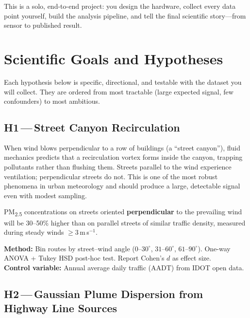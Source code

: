 \documentclass[11pt, letterpaper]{article}
\begin{document}
This is a solo, end-to-end project: you design the hardware, collect every data point yourself,
build the analysis pipeline, and tell the final scientific story---from sensor to published result.

\newpage

\section{Scientific Goals and Hypotheses}

Each hypothesis below is specific, directional, and testable with the dataset you will collect.
They are ordered from most tractable (large expected signal, few confounders) to most ambitious.

\subsection{H1\,---\,Street Canyon Recirculation}

When wind blows perpendicular to a row of buildings (a ``street canyon''), fluid mechanics predicts
that a recirculation vortex forms inside the canyon, trapping pollutants rather than flushing them.
Streets parallel to the wind experience ventilation; perpendicular streets do not. This is one of the
most robust phenomena in urban meteorology and should produce a large, detectable signal even with
modest sampling.

\begin{tcolorbox}[callout, title={Testable Hypothesis}]
PM\textsubscript{2.5} concentrations on streets oriented \textbf{perpendicular} to the prevailing
wind will be 30--50\% higher than on parallel streets of similar traffic density, measured during
steady winds $\geq 3$\,m\,s$^{-1}$.

\medskip
\textbf{Method:} Bin routes by street--wind angle ($0$--$30^\circ$, $31$--$60^\circ$, $61$--$90^\circ$).
One-way ANOVA + Tukey HSD post-hoc test. Report Cohen's $d$ as effect size.\\
\textbf{Control variable:} Annual average daily traffic (AADT) from IDOT open data.
\end{tcolorbox}

\subsection{H2\,---\,Gaussian Plume Dispersion from Highway Line Sources}
\end{document}
